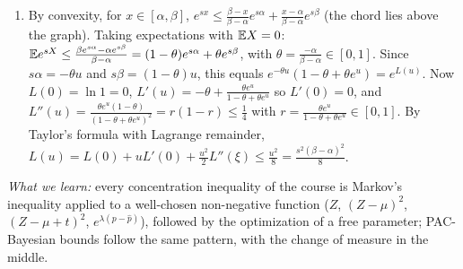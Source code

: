 \documentclass[11pt]{article}
\begin{document}
\begin{solution}
\begin{enumerate}
      interval of length $\frac1m$. By independence and Hoeffding's lemma,
      \[\E e^{\lambda(p-\hat p)}=\prod_{i=1}^m\E e^{\lambda\frac{p-Z_i}m}\leq\prod_{i=1}^me^{\lambda^2/(8m^2)}=e^{\lambda^2/(8m)}.\]
      (b) For $\lambda>0$, $x\mapsto e^{\lambda x}$ is increasing, so by Markov
      $\P(p-\hat p\geq\varepsilon)=\P(e^{\lambda(p-\hat p)}\geq e^{\lambda\varepsilon})\leq e^{-\lambda\varepsilon}\E e^{\lambda(p-\hat p)}\leq e^{-\lambda\varepsilon+\lambda^2/(8m)}$.
      The exponent is minimal at $\lambda=4m\varepsilon$, where it equals $-4m\varepsilon^2+2m\varepsilon^2=-2m\varepsilon^2$.
      (c) Setting $e^{-2m\varepsilon^2}=\delta$ gives $\varepsilon=\sqrt{\ln(1/\delta)/(2m)}$: with probability $\geq1-\delta$,
      $p<\hat p+\varepsilon$. The same argument applied to $1-Z_i$ bounds $\P(\hat p-p\geq\varepsilon)$; with the union bound
      (each side at $\delta/2$), $|p-\hat p|\leq\sqrt{\ln(2/\delta)/(2m)}$ with probability $\geq1-\delta$. For $K$ classifiers
      $h_1,\dots,h_K$ fixed \emph{before} seeing $S$, applying the one-sided bound to each with $\delta/K$ gives,
      with probability $\geq1-\delta$, for all $k$: $\RD(h_k)\leq\RS(h_k)+\sqrt{\ln(K/\delta)/(2m)}$. The price of $K$ classifiers
      is only logarithmic.
\item By convexity, for $x\in[\alpha,\beta]$, $e^{sx}\leq\frac{\beta-x}{\beta-\alpha}e^{s\alpha}+\frac{x-\alpha}{\beta-\alpha}e^{s\beta}$ (the
      chord lies above the graph). Taking expectations with $\mathbb{E} X=0$:
      $\mathbb{E} e^{sX}\leq\frac{\beta e^{s\alpha}-\alpha e^{s\beta}}{\beta-\alpha}=(1-\theta)e^{s\alpha}+\theta e^{s\beta}$, with $\theta=\frac{-\alpha}{\beta-\alpha}\in[0,1]$.
      Since $s\alpha=-\theta u$ and $s\beta=(1-\theta)u$, this equals $e^{-\theta u}(1-\theta+\theta e^u)=e^{L(u)}$. Now $L(0)=\ln1=0$,
      $L'(u)=-\theta+\frac{\theta e^u}{1-\theta+\theta e^u}$ so $L'(0)=0$, and $L''(u)=\frac{\theta e^u(1-\theta)}{(1-\theta+\theta e^u)^2}=r(1-r)\leq\frac14$
      with $r=\frac{\theta e^u}{1-\theta+\theta e^u}\in[0,1]$. By Taylor's formula with Lagrange remainder,
      $L(u)=L(0)+uL'(0)+\frac{u^2}2L''(\xi)\leq\frac{u^2}8=\frac{s^2(\beta-\alpha)^2}8$.
\end{enumerate}
\emph{What we learn:} every concentration inequality of the course is Markov's inequality applied to a well-chosen
non-negative function ($Z$, $(Z-\mu)^2$, $(Z-\mu+t)^2$, $e^{\lambda(p-\hat p)}$), followed by the optimization of a free
parameter; PAC-Bayesian bounds follow the same pattern, with the change of measure in the middle.
\end{solution}
\end{document}
